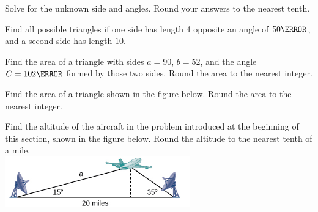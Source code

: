\newpage

\begin{example}
  Solve for the unknown side and angles. Round your answers to the nearest tenth.\\
\end{example}


\begin{example}
  Find all possible triangles if one side has length  4 opposite an angle of  $50\degree$, and a second side has length $10$.
\end{example}


\begin{example}
  Find the area of a triangle with sides $a=90$, $b=52$, and the angle $C=102\degree$ formed by those two sides. Round the area to the nearest integer.
\end{example}

\vspace*{-0.1\textheight}
\newpage

\begin{example}
  Find the area of a triangle shown in the figure below. Round the area to the nearest integer.\\
\end{example}


\begin{example}
  Find the altitude of the aircraft in the problem introduced at the beginning of this section, shown in the figure below. Round the altitude to the nearest tenth of a mile.\\
  \includegraphics[width=0.6\textwidth]{figs/CNX_Precalc_Figure_08_01_016.jpg}
\end{example}

